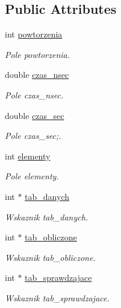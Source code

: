 \subsection*{Public Attributes}
\begin{DoxyCompactItemize}
\item 
int \hyperlink{classalgorytm_a6f208bf8705cfe407a3b7dea8b1e871c}{powtorzenia}
\begin{DoxyCompactList}\small\item\em Pole powtorzenia. \end{DoxyCompactList}\item 
double \hyperlink{classalgorytm_a3d448d22ae50bd472f6daadd7bd24670}{czas\-\_\-nsec}
\begin{DoxyCompactList}\small\item\em Pole czas\-\_\-nsec. \end{DoxyCompactList}\item 
double \hyperlink{classalgorytm_a8e8e89b83e539607b01b5a33f8203d27}{czas\-\_\-sec}
\begin{DoxyCompactList}\small\item\em Pole czas\-\_\-sec;. \end{DoxyCompactList}\item 
int \hyperlink{classalgorytm_aa8284a41958410778215e08dc305f409}{elementy}
\begin{DoxyCompactList}\small\item\em Pole elementy. \end{DoxyCompactList}\item 
int $\ast$ \hyperlink{classalgorytm_a7bbde139599763bf8b36d21c6f314a1a}{tab\-\_\-danych}
\begin{DoxyCompactList}\small\item\em Wskaznik tab\-\_\-danych. \end{DoxyCompactList}\item 
int $\ast$ \hyperlink{classalgorytm_a02dd561c7411091f78e0d058bb1485df}{tab\-\_\-obliczone}
\begin{DoxyCompactList}\small\item\em Wskaznik tab\-\_\-obliczone. \end{DoxyCompactList}\item 
int $\ast$ \hyperlink{classalgorytm_a67ec91f63071c85dea86bed4b77d5239}{tab\-\_\-sprawdzajace}
\begin{DoxyCompactList}\small\item\em Wskaznik tab\-\_\-sprawdzajace. \end{DoxyCompactList}\item 

\end{DoxyCompactItemize}
